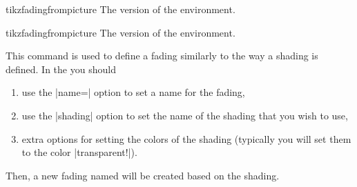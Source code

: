 \begin{plainenvironment}{{tikzfadingfrompicture}}
    The  version of the environment.
\end{plainenvironment}

\begin{contextenvironment}{{tikzfadingfrompicture}}
    The  version of the environment.
\end{contextenvironment}

\begin{command}{\tikzfading{}}
    This command is used to define a fading similarly to the way a shading is
    defined. In the  you should
    \begin{enumerate}
        \item use the |name=| option to set a name for the fading,
        \item use the |shading| option to set the name of the shading that you
            wish to use,
        \item extra options for setting the colors of the shading (typically
            you will set them to the color |transparent!|).
    \end{enumerate}
    Then, a new fading named  will be created based on the shading.
\begin{codeexample}[preamble={\usetikzlibrary{fadings,patterns}}]
\tikzfading[name=fade right,
            left color=transparent!0,
            right color=transparent!100]

\end{codeexample}

\begin{codeexample}[preamble={\usetikzlibrary{fadings,patterns}}]
\tikzfading[name=fade out,
            inner color=transparent!0,
            outer color=transparent!100]

\end{codeexample}
\end{command}


